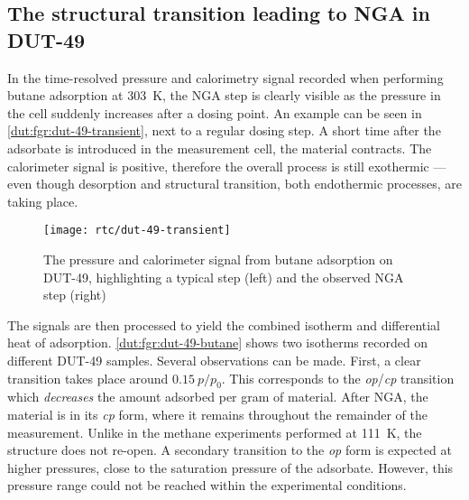 
\subsection{The structural transition leading to NGA in DUT-49}

In the time-resolved pressure and calorimetry signal recorded when
performing butane adsorption at \SI{303}{\kelvin}, the NGA step 
is clearly visible as the pressure in the cell suddenly increases 
after a dosing point. An example can be seen 
in \autoref{dut:fgr:dut-49-transient}, next to a regular dosing step.
A short time after the adsorbate is introduced in the measurement
cell, the material contracts. The calorimeter signal is
positive, therefore the overall process is still exothermic --- even
though desorption and structural transition, both endothermic
processes, are taking place.

\begin{figure}[htb]
    \texttt{[image: rtc/dut-49-transient]}%
    \caption{The pressure and calorimeter signal from butane adsorption
    on DUT-49, highlighting a typical step (left) and the 
    observed NGA step (right)}%
    \label{dut:fgr:dut-49-transient}
\end{figure}

The signals are then processed to yield the combined isotherm and
differential heat of adsorption. \autoref{dut:fgr:dut-49-butane} shows
two isotherms recorded on different DUT-49 samples. 
Several observations can be made. First, a clear transition takes place
around \(0.15~p/p_0\). This corresponds to the \textit{op}/\textit{cp} 
transition which \textit{decreases} the amount adsorbed per gram 
of material. After NGA, the material is in its \textit{cp} form,
where it remains throughout the remainder of the measurement. 
Unlike in the methane experiments performed at 
\SI{111}{\kelvin}, the structure does not re-open. A secondary 
transition to the \textit{op} form is expected at higher pressures,
close to the saturation pressure of the adsorbate. However, this 
pressure range could not be reached within the experimental conditions.

